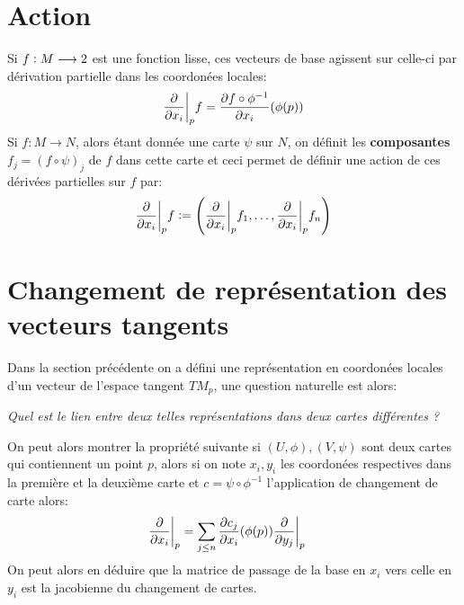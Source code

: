    \section{Action}
      Si \( f : M \longrightarrow 2 \) est une fonction lisse, ces vecteurs de base agissent sur celle-ci par dérivation partielle dans les coordonées locales:
      \[ 
         \frac{\partial }{\partial x_i}\biggr|_pf = \frac{\partial f \circ \phi^{-1}}{\partial x_i}(\phi(p))
      \]
      Si \( f : M \longrightarrow N \), alors étant donnée une carte \( \psi \) sur \( N \), on définit les \textbf{composantes} \( f_j = (f \circ \psi)_j \) de \( f \) dans cette carte et ceci permet de définir une action de ces dérivées partielles sur \( f \) par:
      \[ 
         \frac{\partial }{\partial x_i}\biggr|_pf := \left(\frac{\partial }{\partial x_i}\biggr|_pf_1, \ldots, \frac{\partial }{\partial x_i}\biggr|_pf_n\right)
      \]
   \section{Changement de représentation des vecteurs tangents}
      Dans la section précédente on a défini une représentation en coordonées locales d'un vecteur de l'espace tangent \( TM_p \), une question naturelle est alors:
      \begin{center}
         \textit{Quel est le lien entre deux telles représentations dans deux cartes différentes ?}
      \end{center}
      On peut alors montrer la propriété suivante si \( (U, \phi), (V, \psi) \) sont deux cartes qui contiennent un point \( p \), alors si on note \( x_i, y_i \) les coordonées respectives dans la première et la deuxième carte et \( c = \psi \circ \phi^{-1} \) l'application de changement de carte alors:
      \begin{align*}
         \frac{\partial }{\partial x_i}\biggr|_p &= \sum_{j \leq n} \frac{\partial c_j}{\partial x_i}(\phi(p)) \frac{\partial }{\partial y_j}\biggr|_p
      \end{align*}
      On peut alors en déduire que la matrice de passage de la base en \( x_i \) vers celle en \( y_i \) est la jacobienne du changement de cartes.
